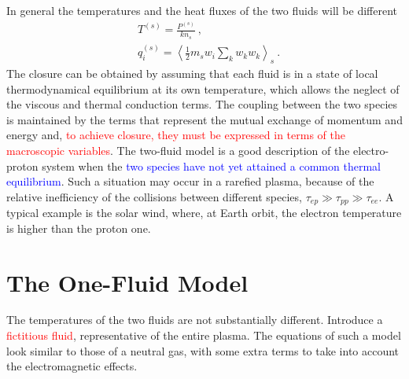 \documentclass[12pt,a4paper]{article}
\begin{document}
In general the temperatures and the heat fluxes of the two fluids will be different
\begin{align}
& T^{(s)} = \frac{P^{(s)} }{kn_s} ~, \\
& q_i^{(s)} = \left\langle \frac{1}{2} m_s w_i \sum_k w_k w_k \right\rangle_s ~.
\end{align}
The closure can be obtained by assuming that each fluid is in a state of local thermodynamical equilibrium at its own temperature, which allows the neglect of the viscous and thermal conduction terms. The coupling between the two
species is maintained by the terms that represent the mutual exchange of momentum and energy and, \textcolor{red}{to achieve closure, they must be expressed in terms of the macroscopic variables}. The two-fluid model is a good description of the electro-proton system when the \textcolor{blue}{two species have not yet attained a common thermal equilibrium}. Such a situation may occur in a rarefied plasma, because of the relative inefficiency of the collisions between different species, $\tau_{ep} \gg \tau_{pp} \gg \tau_{ee}$. A typical example is the solar wind,
where, at Earth orbit, the electron temperature is higher than the proton one.

\section{The One-Fluid Model}
The temperatures of the two fluids are not substantially different. Introduce a \textcolor{red}{fictitious fluid}, representative of the entire plasma. The equations of such a model look similar to those of a neutral gas, with some extra terms to take into account the electromagnetic effects.
\end{document}
